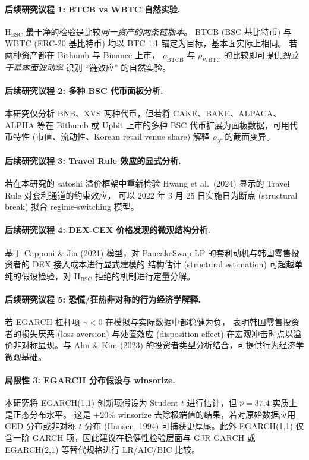 \documentclass[11pt,a4paper]{article}
\begin{document}
\paragraph{后续研究议程 1: BTCB vs WBTC 自然实验.}
$\mathrm{H_{BSC}}$ 最干净的检验是比较\emph{同一资产的两条链版本}。
BTCB (BSC 基比特币) 与 WBTC (ERC-20 基比特币) 均以 BTC 1:1 锚定为目标，基本面实际上相同。
若两种资产都在 Bithumb 与 Binance 上市，
$\rho_{\text{BTCB}}$ 与 $\rho_{\text{WBTC}}$ 的比较即可提供\emph{独立于基本面波动率} 识别 ``链效应'' 的自然实验。

\paragraph{后续研究议程 2: 多种 BSC 代币面板分析.}
本研究仅分析 BNB、XVS 两种代币，但若将 CAKE、BAKE、ALPACA、ALPHA 等在 Bithumb 或 Upbit 上市的多种
BSC 代币扩展为面板数据，可用代币特性 (市值、流动性、Korean retail venue share) 解释 $\rho_X$ 的截面变异。

\paragraph{后续研究议程 3: Travel Rule 效应的显式分析.}
若在本研究的 satoshi 溢价框架中重新检验 Hwang et al.\ (2024) 显示的 Travel Rule 对套利通道的约束效应，
可以 2022 年 3 月 25 日实施日为断点 (structural break) 拟合 regime-switching 模型。

\paragraph{后续研究议程 4: DEX-CEX 价格发现的微观结构分析.}
基于 Capponi \& Jia (2021) 模型，对 PancakeSwap LP 的套利动机与韩国零售投资者的 DEX 接入成本进行显式建模的
结构估计 (structural estimation) 可超越单纯的假设检验，对 $\mathrm{H_{BSC}}$ 拒绝的机制进行定量分解。

\paragraph{后续研究议程 5: 恐慌/狂热非对称的行为经济学解释.}
若 EGARCH 杠杆项 $\gamma<0$ 在模拟与实际数据中都稳健为负，
表明韩国零售投资者的损失厌恶 (loss aversion) 与处置效应 (disposition effect) 
在宏观冲击时点以溢价非对称显现。与 Ahn \& Kim (2023) 的投资者类型分析结合，可提供行为经济学微观基础。

\paragraph{局限性 3: EGARCH 分布假设与 winsorize.}
本研究将 EGARCH(1,1) 创新项假设为 Student-$t$ 进行估计，但 $\hat\nu=37.4$ 实质上是正态分布水平。
这是 $\pm 20\%$ winsorize 去除极端值的结果，若对原始数据应用 GED 分布或非对称 $t$ 分布 (Hansen, 1994)
可捕获更厚尾。此外 EGARCH(1,1) 仅含一阶 GARCH 项，因此建议在稳健性检验层面与 GJR-GARCH 或 EGARCH(2,1)
等替代规格进行 LR/AIC/BIC 比较。
\end{document}
